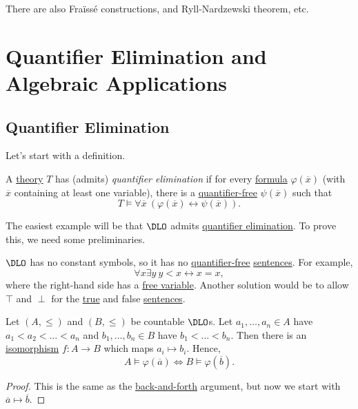 \begin{remark}
	There are also Fraïssé constructions, and Ryll-Nardzewski theorem, etc.
\end{remark}

\chapter{Quantifier Elimination and Algebraic Applications}
\section{Quantifier Elimination}
Let's start with a definition.

\begin{definition}\label{def:quantifier-elimination}
	A \hyperref[def:theory]{theory} \(T\) has (admits) \emph{quantifier elimination} if for every \hyperref[def:formula]{formula} \(\varphi (\overline{x} )\) (with \(\overline{x} \) containing at least one variable), there is a \hyperref[not:quantifier-free]{quantifier-free} \(\psi (\overline{x} )\) such that
	\[
		T \models \forall \overline{x} \ (\varphi (\overline{x} ) \leftrightarrow \psi (\overline{x} )).
	\]
\end{definition}

The easiest example will be that \(\DLO\) admits \hyperref[def:quantifier-elimination]{quantifier elimination}. To prove this, we need some preliminaries.

\begin{note}
	\(\DLO\) has no constant symbols, so it has no \hyperref[not:quantifier-free]{quantifier-free} \hyperref[def:sentence]{sentences}. For example,
	\[
		\forall x\exists y\ y < x \leftrightarrow x = x,
	\]
	where the right-hand side has a \hyperref[def:free-variable]{free variable}. Another solution would be to allow \(\top\) and \(\perp \) for the \hyperref[def:truth]{true} and false \hyperref[def:sentence]{sentences}.
\end{note}

\begin{lemma}\label{lma:DLO-isomorphism}
	Let \((A, \leq )\) and \((B, \leq )\) be countable \(\DLO\)s. Let \(a_1, \ldots , a_n\in A\) have \(a_1 < a_2 < \ldots < a_n\) and \(b_1, \ldots , b_n \in B\) have \(b_1 < \ldots < b_n\). Then there is an \hyperref[def:isomorphism]{isomorphism} \(f\colon A \to B\) which maps \(a_i \mapsto b_i\). Hence,
	\[
		A \models \varphi (\overline{a} ) \iff B \models \varphi (\overline{b} ).
	\]
\end{lemma}
\begin{proof}
	This is the same as the \hyperref[not:back-and-forth]{back-and-forth} argument, but now we start with \(\overline{a} \mapsto \overline{b} \).
\end{proof}

